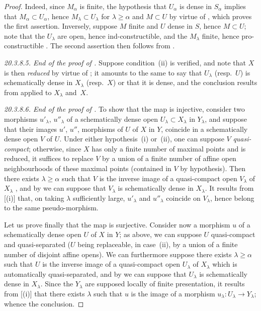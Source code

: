 \begin{proof}
Indeed, since $M_\alpha$ is finite, the hypothesis that $U_\alpha$ is dense in $S_\alpha$ implies that $M_\alpha\subset U_\alpha$, hence $M_\lambda\subset U_\lambda$ for $\lambda\geq\alpha$ and $M\subset U$ by virtue of , which proves the first assertion.
Inversely, suppose $M$ finite and $U$ dense in $S$, hence $M\subset U$; note that the $U_\lambda$ are open, hence ind-constructible, and the $M_\lambda$ finite, hence pro-constructible .
The second assertion then follows from .

\emph{20.3.8.5. End of the proof of .}
Suppose condition~(ii) is verified, and note that $X$ is then \emph{reduced} by virtue of ;
it amounts to the same to say that $U_\lambda$ (resp.\ $U$) is schematically dense in $X_\lambda$ (resp.\ $X$) or that it is dense, and the conclusion results from  applied to $X_\lambda$ and~$X$.

\emph{20.3.8.6. End of the proof of .}
To show that the map  is injective, consider two morphisms $u'_\lambda$, $u''_\lambda$ of a schematically dense open $U_\lambda\subset X_\lambda$ in $Y_\lambda$, and suppose that their images $u'$, $u''$, morphisms of $U$ of $X$ in $Y$, coincide in a schematically dense open $V$ of $U$.
Under either hypothesis~(i) or~(ii), one can suppose $V$ \emph{quasi-compact};
otherwise, since $X$ has only a finite number of maximal points and is reduced, it suffices to replace $V$ by a union of a finite number of affine open neighbourhoods of these maximal points (contained in $V$ by hypothesis).
Then there exists $\lambda\geq\alpha$ such that $V$ is the inverse image of a quasi-compact open $V_\lambda$ of $X_\lambda$ , and by  we can suppose that $V_\lambda$ is schematically dense in $X_\lambda$.
It results from [(i)] that, on taking $\lambda$ sufficiently large, $u'_\lambda$ and $u''_\lambda$ coincide on $V_\lambda$, hence belong to the same pseudo-morphism.

Let us prove finally that the map  is surjective.
Consider now a morphism $u$ of a schematically dense open $U$ of $X$ in $Y$;
as above, we can suppose $U$ quasi-compact and quasi-separated ($U$ being replaceable, in case~(ii), by a union of a finite number of disjoint affine opens).
We can furthermore suppose there exists $\lambda\geq\alpha$ such that $U$ is the inverse image of a quasi-compact open $U_\lambda$ of $X_\lambda$  which is automatically quasi-separated, and by  we can suppose that $U_\lambda$ is schematically dense in $X_\lambda$.
Since the $Y_\lambda$ are supposed locally of finite presentation, it results from [(i)] that there exists $\lambda$ such that $u$ is the image of a morphism $u_\lambda:U_\lambda\to Y_\lambda$; whence the conclusion.


\end{proof}
